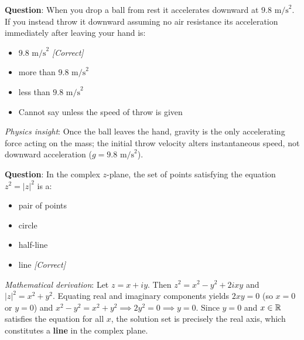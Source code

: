 \documentclass[../../main.tex]{subfiles}
\begin{document}
\begin{center}
\begin{minipage}{0.95\textwidth}
\begin{tcolorbox}[colback=cardBg,colframe=cardLine,arc=2pt,boxrule=0.5pt,title=\textbf{MMLU Example 1: Conceptual Physics}]
\small\sffamily
\textbf{Question}: When you drop a ball from rest it accelerates downward at $9.8\text{ m/s}^2$. If you instead throw it downward assuming no air resistance its acceleration immediately after leaving your hand is:
\begin{itemize}[leftmargin=1.5em,itemsep=1pt]
    \item[\textbf{(A)}] $9.8\text{ m/s}^2$ \hfill \textit{[Correct]}
    \item[\textbf{(B)}] more than $9.8\text{ m/s}^2$
    \item[\textbf{(C)}] less than $9.8\text{ m/s}^2$
    \item[\textbf{(D)}] Cannot say unless the speed of throw is given
\end{itemize}
\textit{Physics insight}: Once the ball leaves the hand, gravity is the only accelerating force acting on the mass; the initial throw velocity alters instantaneous speed, not downward acceleration ($g = 9.8\text{ m/s}^2$).
\end{tcolorbox}
\end{minipage}
\end{center}

\vspace{0.2cm}

\begin{center}
\begin{minipage}{0.95\textwidth}
\begin{tcolorbox}[colback=cardBg,colframe=cardLine,arc=2pt,boxrule=0.5pt,title=\textbf{MMLU Example 2: College Mathematics}]
\small\sffamily
\textbf{Question}: In the complex $z$-plane, the set of points satisfying the equation $z^2 = |z|^2$ is a:
\begin{itemize}[leftmargin=1.5em,itemsep=1pt]
    \item[\textbf{(A)}] pair of points
    \item[\textbf{(B)}] circle
    \item[\textbf{(C)}] half-line
    \item[\textbf{(D)}] line \hfill \textit{[Correct]}
\end{itemize}
\textit{Mathematical derivation}: Let $z = x + iy$. Then $z^2 = x^2 - y^2 + 2ixy$ and $|z|^2 = x^2 + y^2$. Equating real and imaginary components yields $2xy = 0$ (so $x=0$ or $y=0$) and $x^2 - y^2 = x^2 + y^2 \implies 2y^2 = 0 \implies y = 0$. Since $y=0$ and $x \in \mathbb{R}$ satisfies the equation for all $x$, the solution set is precisely the real axis, which constitutes a \textbf{line} in the complex plane.
\end{tcolorbox}
\end{minipage}
\end{center}
\end{document}
